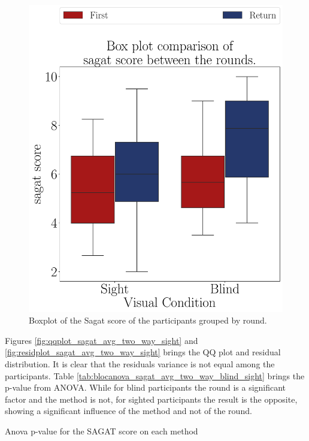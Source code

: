 \begin{figure}[!htb]
\begin{minipage}{0.45\textwidth}
        \includegraphics[width = \linewidth]{Resultados/Sagat/Figuras/pdf/boxplot_sagat_4_rounds.pdf}
        \caption{Boxplot of the Sagat score of the participants grouped by round.}
        \label{fig:boxplot_sagat_4_rounds}
    \end{minipage}
\end{figure}

Figures \ref{fig:qqplot_sagat_avg_two_way_sight} and \ref{fig:residplot_sagat_avg_two_way_sight} brings the QQ plot and residual distribution. It is clear that the residuals variance is not equal among the participants. Table \ref{tab:blocanova_sagat_avg_two_way_blind_sight} brings the p-value from ANOVA. While for blind participants the round is a significant factor and the method is not, for sighted participants the result is the opposite, showing a significant influence of the method and not of the round.

\begin{table}[!htb]
    \caption{Anova p-value for the SAGAT score on each method}
    \label{tab:blocanova_sagat_avg_two_way_blind_sight}
\begin{minipage}{0.45\textwidth}
    
\end{minipage}
\begin{minipage}{0.45\textwidth}
        
\end{minipage}
\end{table}


